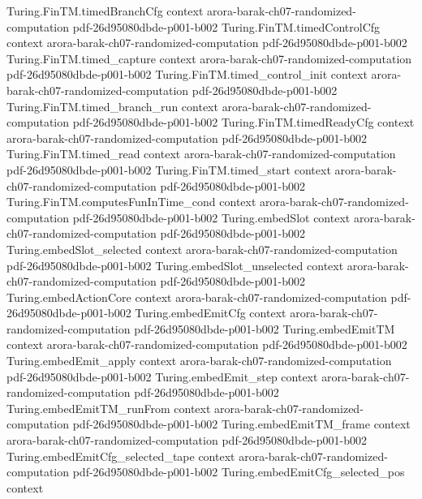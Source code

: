 \begin{theorem}
  {Turing.FinTM.timedBranchCfg}
  {context}
  {arora-barak-ch07-randomized-computation}
  {pdf-26d95080dbde-p001-b002}
\proofstep
  {Turing.FinTM.timedControlCfg}
  {context}
  {arora-barak-ch07-randomized-computation}
  {pdf-26d95080dbde-p001-b002}
\proofstep
  {Turing.FinTM.timed_capture}
  {context}
  {arora-barak-ch07-randomized-computation}
  {pdf-26d95080dbde-p001-b002}
\proofstep
  {Turing.FinTM.timed_control_init}
  {context}
  {arora-barak-ch07-randomized-computation}
  {pdf-26d95080dbde-p001-b002}
\proofstep
  {Turing.FinTM.timed_branch_run}
  {context}
  {arora-barak-ch07-randomized-computation}
  {pdf-26d95080dbde-p001-b002}
\proofstep
  {Turing.FinTM.timedReadyCfg}
  {context}
  {arora-barak-ch07-randomized-computation}
  {pdf-26d95080dbde-p001-b002}
\proofstep
  {Turing.FinTM.timed_read}
  {context}
  {arora-barak-ch07-randomized-computation}
  {pdf-26d95080dbde-p001-b002}
\proofstep
  {Turing.FinTM.timed_start}
  {context}
  {arora-barak-ch07-randomized-computation}
  {pdf-26d95080dbde-p001-b002}
\proofstep
  {Turing.FinTM.computesFunInTime_cond}
  {context}
  {arora-barak-ch07-randomized-computation}
  {pdf-26d95080dbde-p001-b002}
\proofstep
  {Turing.embedSlot}
  {context}
  {arora-barak-ch07-randomized-computation}
  {pdf-26d95080dbde-p001-b002}
\proofstep
  {Turing.embedSlot_selected}
  {context}
  {arora-barak-ch07-randomized-computation}
  {pdf-26d95080dbde-p001-b002}
\proofstep
  {Turing.embedSlot_unselected}
  {context}
  {arora-barak-ch07-randomized-computation}
  {pdf-26d95080dbde-p001-b002}
\proofstep
  {Turing.embedActionCore}
  {context}
  {arora-barak-ch07-randomized-computation}
  {pdf-26d95080dbde-p001-b002}
\proofstep
  {Turing.embedEmitCfg}
  {context}
  {arora-barak-ch07-randomized-computation}
  {pdf-26d95080dbde-p001-b002}
\proofstep
  {Turing.embedEmitTM}
  {context}
  {arora-barak-ch07-randomized-computation}
  {pdf-26d95080dbde-p001-b002}
\proofstep
  {Turing.embedEmit_apply}
  {context}
  {arora-barak-ch07-randomized-computation}
  {pdf-26d95080dbde-p001-b002}
\proofstep
  {Turing.embedEmit_step}
  {context}
  {arora-barak-ch07-randomized-computation}
  {pdf-26d95080dbde-p001-b002}
\proofstep
  {Turing.embedEmitTM_runFrom}
  {context}
  {arora-barak-ch07-randomized-computation}
  {pdf-26d95080dbde-p001-b002}
\proofstep
  {Turing.embedEmitTM_frame}
  {context}
  {arora-barak-ch07-randomized-computation}
  {pdf-26d95080dbde-p001-b002}
\proofstep
  {Turing.embedEmitCfg_selected_tape}
  {context}
  {arora-barak-ch07-randomized-computation}
  {pdf-26d95080dbde-p001-b002}
\proofstep
  {Turing.embedEmitCfg_selected_pos}
  {context}

\end{theorem}
